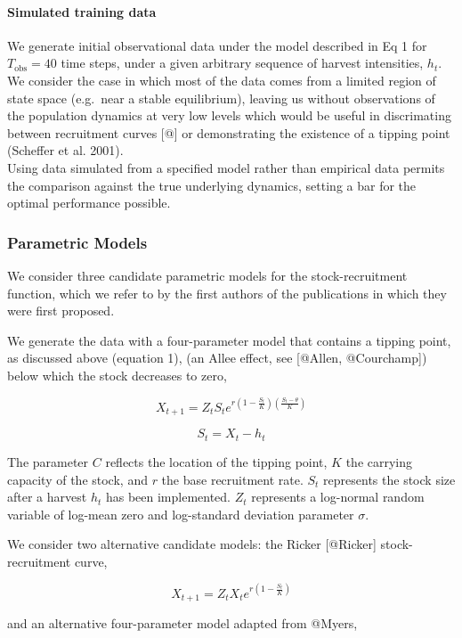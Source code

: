 \documentclass[author-year, review]{elsarticle} %
\begin{document}
\paragraph{Simulated training data}

We generate initial observational data under the model described in Eq 1
for $T_{\textrm{obs}}=40$ time steps, under a given arbitrary sequence
of harvest intensities, $h_t$. We consider the case in which most of the
data comes from a limited region of state space (e.g.~near a stable
equilibrium), leaving us without observations of the population dynamics
at very low levels which would be useful in discrimating between
recruitment curves {[}@{]} or demonstrating the existence of a tipping
point (Scheffer et al. 2001).\\Using data simulated from a specified
model rather than empirical data permits the comparison against the true
underlying dynamics, setting a bar for the optimal performance possible.

\subsubsection{Parametric Models}

We consider three candidate parametric models for the stock-recruitment
function, which we refer to by the first authors of the publications in
which they were first proposed.

We generate the data with a four-parameter model that contains a tipping
point, as discussed above (equation 1), (an Allee effect, see {[}@Allen,
@Courchamp{]}) below which the stock decreases to zero,

\[ X_{t+1} = Z_t S_t e^{r \left(1 - \frac{S_t}{K}\right)\left(\frac{S_t - \theta}{K}\right)} \]

\[ S_t = X_t - h_t \]

The parameter $C$ reflects the location of the tipping point, $K$ the
carrying capacity of the stock, and $r$ the base recruitment rate. $S_t$
represents the stock size after a harvest $h_t$ has been implemented.
$Z_t$ represents a log-normal random variable of log-mean zero and
log-standard deviation parameter $\sigma$.

We consider two alternative candidate models: the Ricker {[}@Ricker{]}
stock-recruitment curve,

\[X_{t+1} = Z_t X_t e^{r \left(1 - \frac{S_t}{K} \right) } \]

and an alternative four-parameter model adapted from @Myers,
\end{document}
